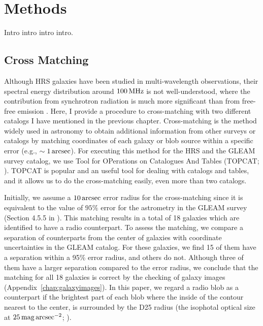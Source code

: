 \chapter{Methods}\label{chap:methods}
\begin{chapabstract}

Intro intro intro intro.

\end{chapabstract}

\section{Cross Matching}\label{sec:crossmatching}
Although HRS galaxies have been studied in multi-wavelength observations, their spectral energy distribution around $100\,\mathrm{MHz}$ is not well-understood, where the contribution from synchrotron radiation is much more significant than from free-free emission \citep{Condon1992a}.
Here, I provide a procedure to cross-matching with two different catalogs I have mentioned in the previous chapter.
Cross-matching is the method widely used in astronomy to obtain additional information from other surveys or catalogs by matching coordinates of each galaxy or blob source within a specific error (e.g., $\sim 1\,\mathrm{arcsec}$).
For executing this method for the HRS and the GLEAM survey catalog, we use Tool for OPerations on Catalogues And Tables (TOPCAT\@; \citealt{Taylor2009}).
TOPCAT is popular and an useful tool for dealing with catalogs and tables, and it allows us to do the cross-matching easily, even more than two catalogs.

Initially, we assume a $10\,\mathrm{arcsec}$ error radius for the cross-matching since it is equivalent to the value of $95\%$ error for the astrometry in the GLEAM survey (Section 4.5.5 in \citealt{Hurley-Walker2017a}).
This matching results in a total of 18 galaxies which are identified to have a radio counterpart.
To assess the matching, we compare a separation of counterparts from the center of galaxies with coordinate uncertainties in the GLEAM catalog.
For these galaxies, we find 15 of them have a separation within a 95\% error radius, and others do not.
Although three of them have a larger separation compared to the error radius, we conclude that the matching for all 18 galaxies is correct by the checking of galaxy images (Appendix~\ref{chap:galaxyimages}).
In this paper, we regard a radio blob as a counterpart if the brightest part of each blob where the inside of the contour nearest to the center, is surrounded by the D25 radius (the isophotal optical size at $25\,\mathrm{mag}\,\mathrm{arcsec}^{-2}$; \citealt{Boselli2010}).


